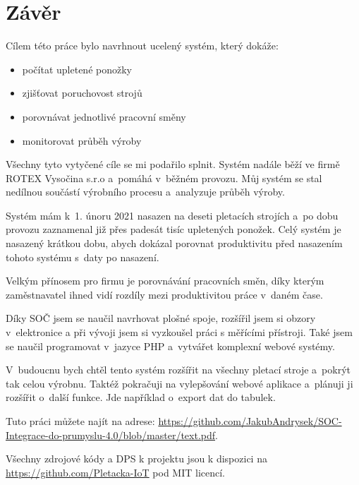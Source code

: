 \chapter*{Závěr}

Cílem této práce bylo navrhnout ucelený systém, který dokáže:

\begin{itemize}
    \item počítat upletené ponožky
    \item zjišťovat poruchovost strojů
    \item porovnávat jednotlivé pracovní směny
    \item monitorovat průběh výroby
\end{itemize}

Všechny tyto vytyčené cíle se mi podařilo splnit. Systém nadále běží ve firmě ROTEX Vysočina s.r.o \cite{ROTEX} a~pomáhá v~běžném provozu.
Můj systém se stal nedílnou součástí výrobního procesu a~analyzuje průběh výroby.

Systém mám k~1. únoru 2021 nasazen na deseti pletacích strojích a~po dobu provozu zaznamenal již přes padesát tisíc upletených ponožek.
Celý systém je nasazený krátkou dobu, abych dokázal porovnat produktivitu před nasazením tohoto systému s~daty po nasazení.

Velkým přínosem pro firmu je porovnávání pracovních směn, díky kterým zaměstnavatel ihned vidí rozdíly mezi produktivitou práce v~daném čase.

Díky SOČ jsem se naučil navrhovat plošné spoje, rozšířil jsem si obzory v~elektronice a při vývoji jsem si vyzkoušel práci s měřícími přístroji. 
Také jsem se naučil programovat v~jazyce PHP a~vytvářet komplexní webové systémy.

V~budoucnu bych chtěl tento systém rozšířit na všechny pletací stroje a~pokrýt tak celou výrobnu.
Taktéž pokračuji na vylepšování webové aplikace a~plánuji ji rozšířit o~další funkce.
Jde například o~export dat do tabulek.

Tuto práci můžete najít na adrese: \url{https://github.com/JakubAndrysek/SOC-Integrace-do-prumyslu-4.0/blob/master/text.pdf}.

Všechny zdrojové kódy a DPS k projektu jsou k dispozici na \url{https://github.com/Pletacka-IoT} pod MIT licencí.


\newpage